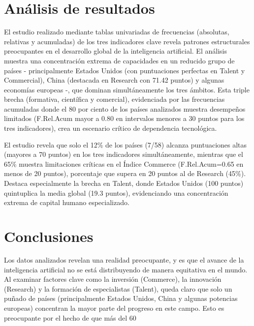 \documentclass[
]{article}
\begin{document}
\begin{multicols}{2}
\section{Análisis de resultados}
El estudio realizado mediante tablas univariadas de frecuencias (absolutas, relativas y acumuladas) de los tres indicadores clave revela patrones estructurales preocupantes en el desarrollo global de la inteligencia artificial. El análisis muestra una concentración extrema de capacidades en un reducido grupo de países - principalmente Estados Unidos (con puntuaciones perfectas en Talent y Commercial), China (destacada en Research con 71.42 puntos) y algunas economías europeas -, que dominan simultáneamente los tres ámbitos. Esta triple brecha (formativa, científica y comercial), evidenciada por las frecuencias acumuladas donde el 80 por ciento de los países analizados muestra desempeños limitados (F.Rel.Acum mayor a 0.80 en intervalos menores a 30 puntos para los tres indicadores), crea un escenario crítico de dependencia tecnológica.

El estudio revela que solo el 12\% de los países (7/58) alcanza puntuaciones altas (mayores a 70 puntos) en los tres indicadores simultáneamente, mientras que el 65\% muestra limitaciones críticas en el Índice Commerce (F.Rel.Acum=0.65 en menos de 20 puntos), porcentaje que supera en 20 puntos al de Research (45\%). Destaca especialmente la brecha en Talent, donde Estados Unidos (100 puntos) quintuplica la media global (19.3 puntos), evidenciando una concentración extrema de capital humano especializado.

\section{Conclusiones}

Los datos analizados revelan una realidad preocupante, y es que el avance de la inteligencia artificial no se está distribuyendo de manera equitativa en el mundo. Al examinar factores clave como la inversión (Commerce), la innovación (Research) y la formación de especialistas (Talent), queda claro que solo un puñado de países (principalmente Estados Unidos, China y algunas potencias europeas) concentran la mayor parte del progreso en este campo. Esto es preocupante por el hecho de que más del 60%


\end{multicols}
\end{document}
